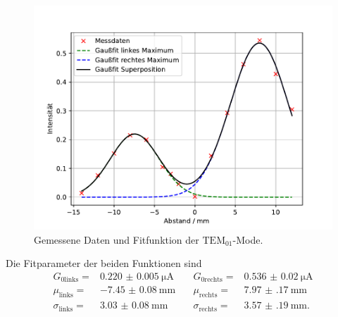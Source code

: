 \begin{figure}
  \centering
  \includegraphics[width = \textwidth, keepaspectratio]{figure/TEM01.pdf}
  \caption{Gemessene Daten und Fitfunktion der $\text{TEM}_{01}$-Mode.}
\end{figure}
\FloatBarrier
Die Fitparameter der beiden Funktionen sind 
\begin{align*}
G_{0 \text{links}}=&\SI{0.220(5)}{\micro\ampere}\quad &G_{0 \text{rechts}}=&\SI{0.536(20)}{\micro\ampere}\\
\mu_{\text{links}} =& \SI{-7.45(8)}{\milli\meter}\quad &\mu_{\text{rechts}} =& \SI{7.97(17)}{\milli\meter}\\
\sigma_{\text{links}} =& \SI{3.03(8)}{\milli\meter}\quad &\sigma_{\text{rechts}} =& \SI{3.57(19)}{\milli\meter}.
\end{align*}
